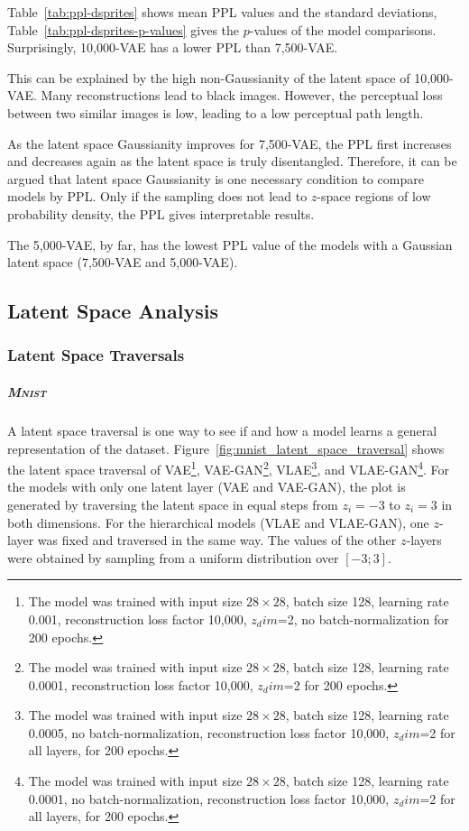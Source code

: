 Table~\ref{tab:ppl-dsprites} shows mean \ac{PPL} values and the standard deviations, Table~\ref{tab:ppl-dsprites-p-values} gives the $p$-values of the model comparisons.
Surprisingly, 10,000-\ac{VAE} has a lower \ac{PPL} than 7,500-\ac{VAE}.

This can be explained by the high non-Gaussianity of the latent space of 10,000-\ac{VAE}.
Many reconstructions lead to black images.
However, the perceptual loss between two similar images is low, leading to a low perceptual path length.

As the latent space Gaussianity improves for 7,500-\ac{VAE}, the \ac{PPL} first increases and decreases again as the latent space is truly disentangled.
Therefore, it can be argued that latent space Gaussianity is one necessary condition to compare models by \ac{PPL}.
Only if the sampling does not lead to $z$-space regions of low probability density, the \ac{PPL} gives interpretable results.

The 5,000-\ac{VAE}, by far, has the lowest \ac{PPL} value of the models with a Gaussian latent space (7,500-\ac{VAE} and 5,000-\ac{VAE}).

\subsection{Latent Space Analysis}\label{subsec:model-generated-samples}

\subsubsection{Latent Space Traversals}\label{subsubsec:latent_space_traversals}

\subparagraph{\textsc{Mnist}}

A latent space traversal is one way to see if and how a model learns a general representation of the dataset.
Figure~\ref{fig:mnist_latent_space_traversal} shows the latent space traversal of \ac{VAE}\footnote{The model was trained with input size $28\times 28$, batch size 128, learning rate 0.001, reconstruction loss factor 10,000, $z_dim$=2, no batch-normalization for 200 epochs.}, \ac{VAE}-\ac{GAN}\footnote{The model was trained with input size $28\times 28$, batch size 128, learning rate 0.0001, reconstruction loss factor 10,000, $z_dim$=2 for 200 epochs.}, \ac{VLAE}\footnote{The model was trained with input size $28\times 28$, batch size 128, learning rate 0.0005, no batch-normalization, reconstruction loss factor 10,000, $z_dim$=2 for all layers, for 200 epochs.}, and \ac{VLAE}-\ac{GAN}\footnote{The model was trained with input size $28\times 28$, batch size 128, learning rate 0.0001, no batch-normalization, reconstruction loss factor 10,000, $z_dim$=2 for all layers, for 200 epochs.}.
For the models with only one latent layer (\ac{VAE} and \ac{VAE}-\ac{GAN}), the plot is generated by traversing the latent space in equal steps from $z_i = -3$ to $z_i = 3$ in both dimensions.
For the hierarchical models (\ac{VLAE} and \ac{VLAE}-\ac{GAN}), one $z$-layer was fixed and traversed in the same way.
The values of the other $z$-layers were obtained by sampling from a uniform distribution over $[-3; 3]$.

